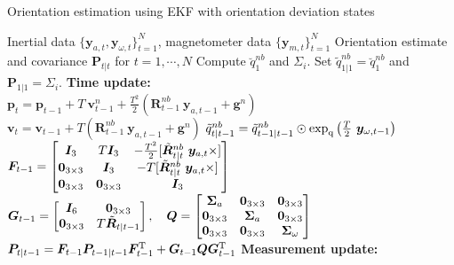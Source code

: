 \begin{algorithm}
	\caption{Orientation estimation using EKF with orientation deviation states \cite{kok2017} }  \label{alg:dq-pose-err1}
		\begin{algorithmic}[1]
		\INPUT Inertial data $ \lbrace \bm{y} _{a,t} , \bm{y} _{\omega,t}  \rbrace _{t=1} ^{N} $, magnetometer data $ \lbrace \bm{y} _{m,t}  \rbrace _{t=1} ^{N} $ 
		\OUTPUT  Orientation estimate  and covariance $ \bm{P} _{t | t} $ for $ t = 1, \cdots, N $
		\STATE Compute $ \breve{q} ^{nb} _{1} $ and $ \Sigma _{i} $. 
		\STATE Set $ \tilde{q} ^{nb} _{1 | 1} = \breve{q} ^{nb} _{1}$ and $ \bm{P} _{1 | 1} = \Sigma _{i} $. 
		\STATE \textbf{Time update:}\\
		\STATE $ \bm{p} _{t}   =   \bm{p} _{t-1} + T\ \bm{v} ^{n} _{t-1}  +  \tfrac {T ^{2}} {2} \left( \bm{R} ^{nb} _{t-1} \ \bm{y} _{a,t-1} + \bm{g} ^{n} \right)  $ 
		\STATE $ \bm{v} _{t}   =   \bm{v} _{t-1} + T \left( \bm{R} ^{nb} _{t-1} \ \bm{y} _{a,t-1} + \bm{g} ^{n} \right) $ 
		\STATE $ \tilde{q} ^{nb} _{t | t-1}   =   \tilde{q} ^{nb} _{t-1 | t-1}   \odot   \exp _\text{q} \left( \tfrac{T}{2} \ \bm{y} _{\omega, t-1} \right) $ 
		\STATE $ \bm{F} _{t-1}   =   \begin{bmatrix}   \bm{I} _{3}   &   T\bm{I} _{3}   &   - \tfrac {T ^{2}} {2} [ \tilde{\bm{R}} ^{nb} _{t | t} \ \bm{y} _{a,t} \times]   \\   \bm{0} _{3 \times 3}   &   \bm{I} _{3}   &   -T [ \tilde{\bm{R}} ^{nb} _{t | t} \ \bm{y} _{a,t} \times ]   \\   \bm{0} _{3 \times 3}   &   \bm{0} _{3 \times 3}   &   \bm{I} _{3}   \end{bmatrix} $ 
		\STATE $ \bm{G} _{t-1}   =   \begin{bmatrix}   \bm{I} _{6}   &   \bm{0} _{3 \times 3}   \\   \bm{0} _{3 \times 3}   &   T \tilde{\bm{R}} _{t | t-1}   \end{bmatrix} ,    \quad   \bm{Q}   =   \begin{bmatrix}   \bm{\Sigma} _{a}   &   \bm{0} _{3 \times 3}   &   \bm{0} _{3 \times 3}   \\   \bm{0} _{3 \times 3}   &   \bm{\Sigma} _{a}   &   \bm{0} _{3 \times 3}   \\   \bm{0} _{3 \times 3}   &   \bm{0} _{3 \times 3}   &   \bm{\Sigma} _{\omega}   \end{bmatrix} $  %
		\STATE $ \bm{P} _{t | t-1}   =   \bm{F} _{t-1} \bm{P} _{t-1 | t-1} \bm{F} _{t-1} ^\text{T}   +   \bm{G} _{t-1} \bm{Q} \bm{G} _{t-1} ^\text{T} $   
		\STATE \textbf{Measurement update:}\\

\end{algorithmic}
\end{algorithm}
